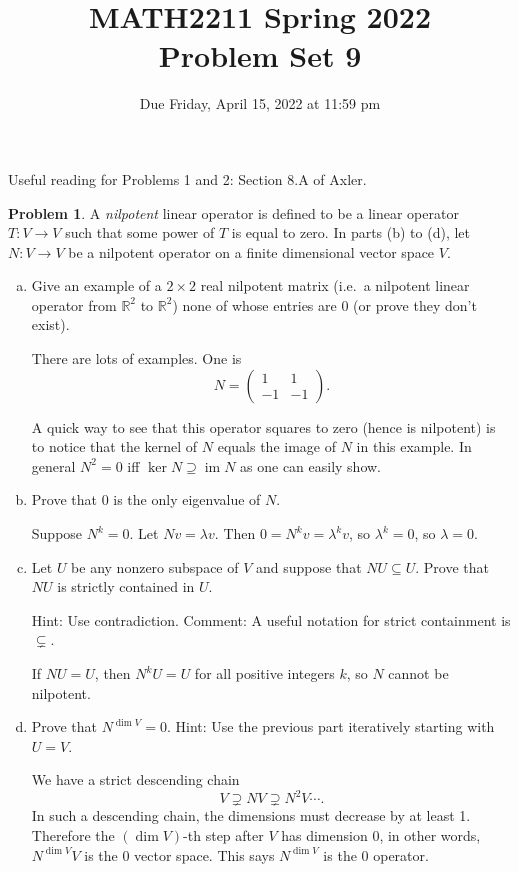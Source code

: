 \documentclass[11pt,oneside]{amsart}
\title{MATH2211 Spring 2022\\
Problem Set 9}
\author{Due Friday, April 15, 2022 at 11:59 pm}
\theoremstyle{definition}
\newtheorem{problem}{Problem}
\newcommand{\bR}{\mathbb{R}}
\DeclareMathOperator{\im}{im}
\begin{document}
    \maketitle

    Useful reading for Problems 1 and 2: Section 8.A of Axler.

    \begin{problem}
        A \emph{nilpotent} linear operator is defined to be a linear operator $T\colon V\to V$ such that some power of $T$ is equal to zero. In parts (b) to (d), let $N\colon V\to V$ be a nilpotent operator on a finite dimensional vector space $V$.
        \begin{enumerate}[(a)]
            \item Give an example of a $2\times 2$ real nilpotent matrix (i.e.\ a nilpotent linear operator from $\bR^2$ to $\bR^2$) none of whose entries are 0 (or prove they don't exist).
            \begin{solution}
                There are lots of examples. One is
                \[N=\begin{pmatrix}
                    1&1\\
                    -1&-1
                \end{pmatrix}.\]
            \end{solution}
            A quick way to see that this operator squares to zero (hence is nilpotent) is to notice that the kernel of $N$ equals the image of $N$ in this example. In general $N^2=0$ iff $\ker N\supseteq \im N$ as one can easily show.
            \item Prove that 0 is the only eigenvalue of $N$.
            \begin{solution}
                Suppose $N^k=0$. Let $Nv=\lambda v$. Then $0=N^kv=\lambda^kv$, so $\lambda^k=0$, so $\lambda=0$.
            \end{solution}
            \item Let $U$ be any nonzero subspace of $V$ and suppose that $NU\subseteq U$. Prove that $NU$ is strictly contained in $U$.
            
            Hint: Use contradiction. Comment: A useful notation for strict containment is $\subsetneq$.
            \begin{solution}
                If $NU=U$, then $N^kU=U$ for all positive integers $k$, so $N$ cannot be nilpotent.
            \end{solution}
            
            \item Prove that $N^{\dim V}=0$. Hint: Use the previous part iteratively starting with $U=V$.
            \begin{solution}
                We have a strict descending chain
                \[V\supsetneq NV\supsetneq N^2V\cdots.\]
                In such a descending chain, the dimensions must decrease by at least 1. Therefore the $(\dim V)$-th step after $V$ has dimension 0, in other words, $N^{\dim V}V$ is the 0 vector space. This says $N^{\dim V}$ is the 0 operator.
            \end{solution}
        \end{enumerate}
    \end{problem}
    
\end{document}
